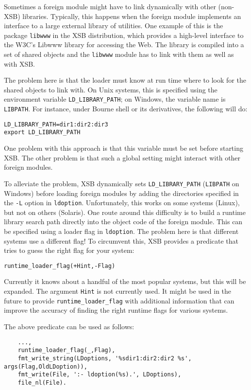 Sometimes a foreign module might have to link dynamically with other
(non-XSB) libraries. Typically, this happens when the foreign module
implements an interface to a large external library of utilities.
One example of this is the package {\tt libwww} in the XSB distribution,
which provides a high-level interface to the W3C's Libwww library for
accessing the Web. The library is compiled into a set of shared objects and
the {\tt libwww} module has to link with them as well as with XSB.

The problem here is that the loader must know at run time where to look for
the shared objects to link with. On Unix systems, this is specified using
the environment variable {\tt LD\_LIBRARY\_PATH}; on Windows, the variable
name is {\tt LIBPATH}. For instance, 
under Bourne shell or its derivatives, the following will do:
\begin{verbatim}
LD_LIBRARY_PATH=dir1:dir2:dir3
export LD_LIBRARY_PATH
\end{verbatim}
One problem with this approach is that this variable must be set before
starting XSB. The other problem is that such a global setting might
interact with other foreign modules.

To alleviate the problem, XSB dynamically sets {\tt LD\_LIBRARY\_PATH}
({\tt LIBPATH} on Windows) before loading foreign modules by adding the
directories specified in the {\tt -L} option in {\tt ldoption}.
Unfortunately, this works on some systems (Linux), but not on others
(Solaris). One route around this difficulty is to build a runtime library
search path directly into the object code of the foreign module. This can
be specified using a loader flag in {\tt ldoption}.  The problem here is
that different systems use a different flag!  To circumvent this, XSB
provides a predicate that tries to guess the right flag for your system:
\begin{verbatim}
runtime_loader_flag(+Hint,-Flag)  
\end{verbatim}
Currently it knows about a handful of the most popular systems, but this
will be expanded. The argument {\tt Hint} is not currently used.
It might be used in the future to provide {\tt runtime\_loader\_flag} with
additional information that can improve the accuracy of finding the right
runtime flags for various systems.

The above predicate can be used as follows:
\begin{verbatim}
    ...,
    runtime_loader_flag(_,Flag),
    fmt_write_string(LDoptions, '%sdir1:dir2:dir2 %s', args(Flag,OldLDoption)),
    fmt_write(File, ':- ldoption(%s).', LDoptions),
    file_nl(File).
\end{verbatim}

